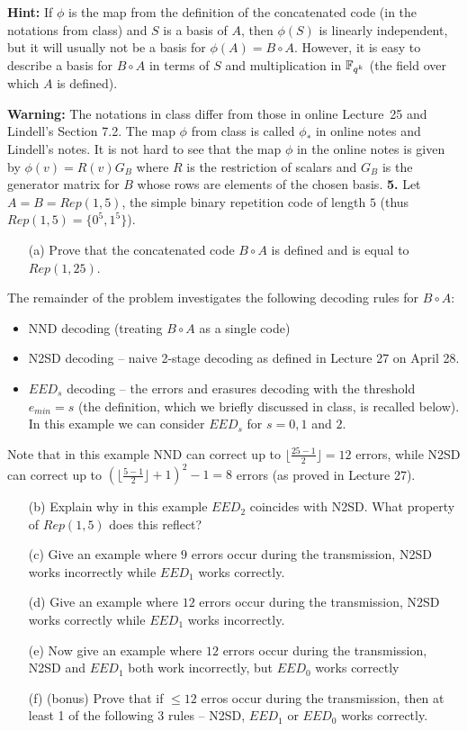 \documentclass[12pt]{amsart}
\begin{document}
{\bf Hint:} If $\phi$ is the map from the definition of the concatenated code (in the notations from class)
and $S$ is a basis of $A$, then $\phi(S)$ is linearly independent, but it will usually not be a basis for $\phi(A)=B\circ A$. However, it is easy to describe a basis for $B\circ A$ in terms of $S$ and multiplication in ${\mathbb F}_{q^k}$ (the field over which
$A$ is defined).
\skv

{\bf Warning:} The notations in class differ from those in online Lecture~25 and Lindell's Section 7.2. The map $\phi$ from class
is called $\phi_*$ in online notes and Lindell's notes. It is not hard to see that the map $\phi$ in the online notes is given by $\phi(v)=R(v)G_B$ where $R$ is the restriction of scalars and $G_B$ is the generator matrix for $B$ whose rows are elements of the chosen basis.
\skv
{\bf 5.} Let $A=B=Rep(1,5)$, the simple binary repetition code of length $5$ (thus $Rep(1,5)=\{0^5,1^5\}$).
\begin{itemize}
\item[(a)] Prove that the concatenated code $B\circ A$ is defined and is equal to $Rep(1,25)$. 
\end{itemize}
The remainder of the problem investigates the following decoding rules for $B\circ A$:
\begin{itemize}
\item NND decoding (treating $B\circ A$ as a single code)
\item N2SD decoding -- naive 2-stage decoding as defined in Lecture 27 on April 28.
\item $EED_s$ decoding -- the errors and erasures decoding with the threshold $e_{min}=s$ (the definition, which we briefly discussed in class, is recalled below). In this example we can consider $EED_s$ for $s=0,1$ and $2$.
\end{itemize}
Note that in this example NND can correct up to $\lfloor \frac{25-1}{2}\rfloor=12$ errors, while N2SD can correct up
to $(\lfloor \frac{5-1}{2}\rfloor+1)^2-1=8$ errors (as proved in Lecture 27).
\begin{itemize}
\item[(b)] Explain why in this example $EED_2$ coincides with N2SD. What property of $Rep(1,5)$ does this reflect?
\item[(c)] Give an example where $9$ errors occur during the transmission, N2SD works incorrectly while $EED_1$ works correctly.
\item[(d)] Give an example where  $12$ errors occur during the transmission, N2SD works correctly while $EED_1$ works incorrectly.
\item[(e)] Now give an example where $12$ errors occur during the transmission, N2SD and $EED_1$ both work incorrectly, but
$EED_0$ works correctly
\item[(f)] (bonus) Prove that if $\leq 12$ erros occur during the transmission, then at least 1 of the following 3 rules -- N2SD,
$EED_1$ or $EED_0$ works correctly.
\end{itemize}
\end{document}
